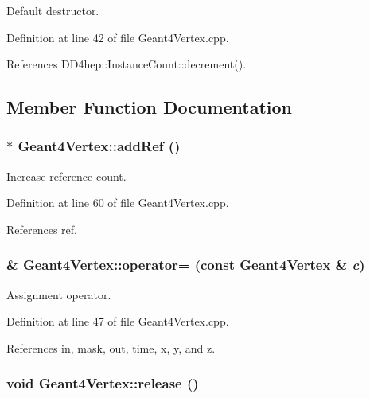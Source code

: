 Default destructor. 

Definition at line 42 of file Geant4Vertex.cpp.

References DD4hep::InstanceCount::decrement().

\subsection{Member Function Documentation}
\hypertarget{class_d_d4hep_1_1_simulation_1_1_geant4_vertex_a9cf0eeb1c981f0f7ae77c0e2776340e6}{
\subsubsection[{addRef}]{ $\ast$ Geant4Vertex::addRef ()}}
\label{class_d_d4hep_1_1_simulation_1_1_geant4_vertex_a9cf0eeb1c981f0f7ae77c0e2776340e6}


Increase reference count. 

Definition at line 60 of file Geant4Vertex.cpp.

References ref.\hypertarget{class_d_d4hep_1_1_simulation_1_1_geant4_vertex_ac96f6fd10cd02f1920b937421832ca46}{
\subsubsection[{operator=}]{ \& Geant4Vertex::operator= (const {\bf Geant4Vertex} \& {\em c})}}
\label{class_d_d4hep_1_1_simulation_1_1_geant4_vertex_ac96f6fd10cd02f1920b937421832ca46}


Assignment operator. 

Definition at line 47 of file Geant4Vertex.cpp.

References in, mask, out, time, x, y, and z.\hypertarget{class_d_d4hep_1_1_simulation_1_1_geant4_vertex_a55c0c51d6d234531cdd6efe1ab83fc37}{
\subsubsection[{release}]{\setlength{\rightskip}{0pt plus 5cm}void Geant4Vertex::release ()}}
\label{class_d_d4hep_1_1_simulation_1_1_geant4_vertex_a55c0c51d6d234531cdd6efe1ab83fc37}



